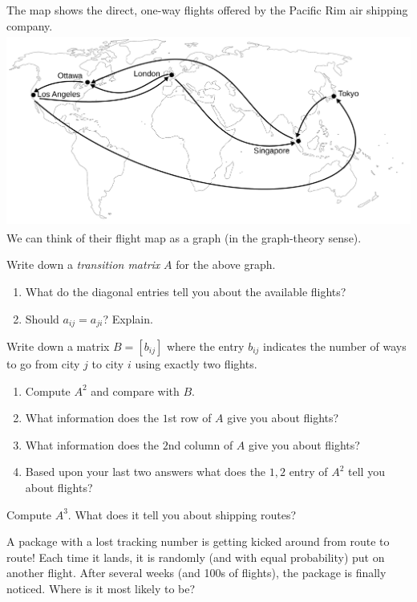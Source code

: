 	\question
	The map shows the direct, one-way flights offered by the Pacific
	Rim air shipping company.
	\includegraphics[height=2.5in]{images/flight_map.pdf}
	We can think of their flight map as a graph (in the graph-theory sense).


	\begin{parts}
		\item Write down a \emph{transition matrix} $A$ for the above graph.
		\begin{enumerate}
			\item What do the diagonal entries tell you about the available flights?
			\item Should $a_{ij} = a_{ji}$? Explain.
		\end{enumerate}
		\item Write down a matrix $B=[b_{ij}]$ where the entry $b_{ij}$ indicates the 
		number of ways to go from city $j$ to city $i$ using exactly two flights.
		\begin{enumerate}
			\item Compute $A^2$ and compare with $B$.
			\item What information does the $1$st row of $A$ give you about flights?
			\item What information does the $2$nd column of $A$ give you about 
			flights?
			\item Based upon your last two answers what does the $1,2$ entry of 
			$A^2$ tell you about flights?
		\end{enumerate}
		\item Compute $A^3$. What does it tell you about shipping routes?
		\item A package with a lost tracking number is getting kicked around from route to route!
			Each time it lands, it is randomly (and with equal probability)
			put on another flight.
			After several weeks (and 100s of flights), the package is finally noticed.
				Where is it most likely to be?
	\end{parts}


